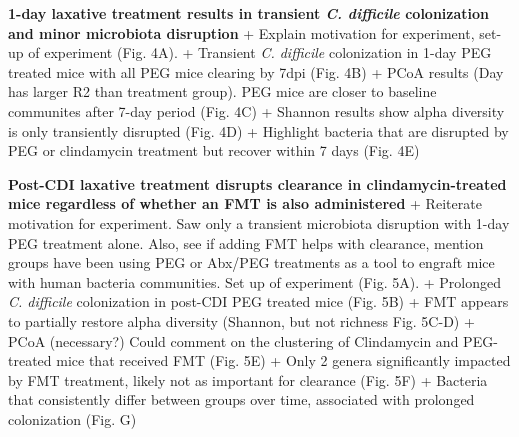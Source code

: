 \documentclass[
  11pt,
]{article}
\begin{document}
\textbf{1-day laxative treatment results in transient \emph{C.
difficile} colonization and minor microbiota disruption} + Explain
motivation for experiment, set-up of experiment (Fig. 4A). + Transient
\emph{C. difficile} colonization in 1-day PEG treated mice with all PEG
mice clearing by 7dpi (Fig. 4B) + PCoA results (Day has larger R2 than
treatment group). PEG mice are closer to baseline communites after 7-day
period (Fig. 4C) + Shannon results show alpha diversity is only
transiently disrupted (Fig. 4D) + Highlight bacteria that are disrupted
by PEG or clindamycin treatment but recover within 7 days (Fig. 4E)

\textbf{Post-CDI laxative treatment disrupts clearance in
clindamycin-treated mice regardless of whether an FMT is also
administered} + Reiterate motivation for experiment. Saw only a
transient microbiota disruption with 1-day PEG treatment alone. Also,
see if adding FMT helps with clearance, mention groups have been using
PEG or Abx/PEG treatments as a tool to engraft mice with human bacteria
communities. Set up of experiment (Fig. 5A). + Prolonged \emph{C.
difficile} colonization in post-CDI PEG treated mice (Fig. 5B) + FMT
appears to partially restore alpha diversity (Shannon, but not richness
Fig. 5C-D) + PCoA (necessary?) Could comment on the clustering of
Clindamycin and PEG-treated mice that received FMT (Fig. 5E) + Only 2
genera significantly impacted by FMT treatment, likely not as important
for clearance (Fig. 5F) + Bacteria that consistently differ between
groups over time, associated with prolonged colonization (Fig. G)
\end{document}
